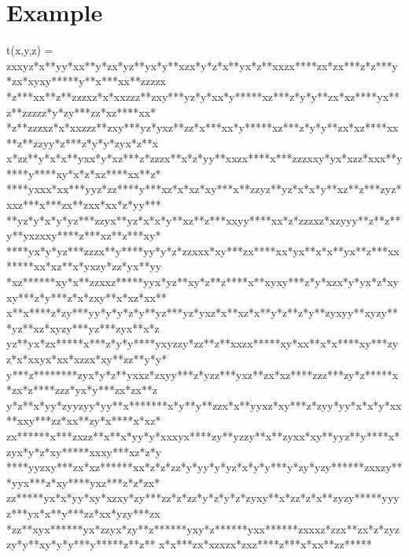 \documentclass{beamer}
\begin{document}
\section{Example}

\begin{frame}
\tiny
t(x,y,z) = \pause
zxxyz*x**yy*xx**y*zx*yz**yx*y**xzx*y*z*x**yx*z**xxzx****zx*zx***z*z***y*zx*xyxy*****y**x***xx**zzzzx
\vspace{-1mm}
*z***xx**z**zzzxz*x*xxzzz**zxy***yz*y*xx*y*****xz***z*y*y**zx*xz****yx**z**zzzzz*y*zy***zz*xz****xx*
\vspace{-1mm}
*z**zzzxz*x*xxzzz**zxy***yz*yxz**zz*x***xx*y*****xz***z*y*y**zx*xz****xx**z**zzyy*z***z*y*y*zyx*z**x
\vspace{-1mm}
x*zz**y*x*x**yxx*y*xz***z*zzzx**x*z*yy**xxzx****x***zzzxxy*yx*xzz*xxx**y****y****xy*x*z*xz****xx**z*
\vspace{-1mm}
****yxxx*xx***yyz*zz****y***xz*x*xz*xy***x**zzyz**yz*x*x*y**xz**z***zyz*xxz***x***zx**zxx*xx*z*yy***
\vspace{-1mm}
**yz*y*x*y*yz***zzyx**yz*x*x*y**xz**z***xxyy****xx*z*zzzxz*xzyyy**z**z**y**yxzxxy****z***xz**z***xy*
\vspace{-1mm}
****yx*y*yz***zzzx**y****yy*y*z*zzxxx*xy***zx****xx*yx**x*x**yx**z***xx*****xx*xz**x*yxzy*zz*yx**yy
\vspace{-1mm}
*xz******xy*x**zzxxz*****yyx*yz**xy*z**z****x**xyxy***z*y*xzx*y*yx*z*xyxy***z*y***z*x*zxy**x*xz*xx**
\vspace{-1mm}
x**x****z*zy***yy*y*y*z*y**yz***yz*yxz*x**xz*x**y*z**z*y**zyxyy**xyzy***yz**xz*xyzy***yz***zyx**x*z
\vspace{-1mm}
yz**yx*zx*****x***z*y*y****yxyzzy*zz**z**xxzx*****xy*xx**x*x****xy***zyz*x*xxyx*xx*xzzx*xy**zz**y*y*
\vspace{-1mm}
y***z********zyx*y*z**yxxz*zxyy***z*yzz***yxz**zx*xz****zzz***zy*z*****x*zx*z****zzz*yx*y***zx*zx**z
\vspace{-1mm}
y*z**x*yy*zyyzyy*yy**x*******x*y**y**zzx*x**yyxz*xy***z*zyy*yy*x*x*y*xx**xxy***zz*xx**zy*x****x*xz*
\vspace{-1mm}
zx******x***zxzz**x**x*yy*y*xxxyx****zy**yzzy**x**zyxx*xy**yyz**y****x*zyx*y*z*xy*****xxxy***xz*z*y
\vspace{-1mm}
****yyzxy***zx*xz******xx*z*z*zz*y*yy*y*yz*x*y*y***y*zy*yzy******zxxzy***yyx***z*xy****yxz***z*z*zx*
\vspace{-1mm}
zz*****yx*x*yy*xy*xzxy*zy***zz*z*zz*y*z*y*z*zyxy**x*zz*z*x**zyzy*****yyyz***yx*x**y***zz*xx*yzy***zx
\vspace{-1mm}
*zz**xyx******yx*zzyx*zy**z******yxy*z******yxx******zxxxz*zzx**zx*z*zyzzy*y**xy*y*y***y*****z**z**
\vspace{-1mm}
x*x***zx*xzxzx*zxz****z***x*xx**zz***** %
\end{frame}
\end{document}
